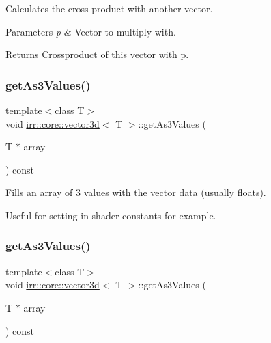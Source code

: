 Calculates the cross product with another vector. 


\begin{DoxyParams}{Parameters}
{\em p} & Vector to multiply with. \\
\hline
\end{DoxyParams}
\begin{DoxyReturn}{Returns}
Crossproduct of this vector with p. 
\end{DoxyReturn}
\mbox{\label{classirr_1_1core_1_1vector3d_af9e676bc10fe34e49e544373a33d7d21}} 
\subsubsection{\texorpdfstring{get\+As3\+Values()}{getAs3Values()}\hspace{0.1cm}{\footnotesize\ttfamily [1/2]}}
{\footnotesize\ttfamily template$<$class T$>$ \\
void \hyperlink{classirr_1_1core_1_1vector3d}{irr\+::core\+::vector3d}$<$ T $>$\+::get\+As3\+Values (\begin{DoxyParamCaption}\item[{T $\ast$}]{array }\end{DoxyParamCaption}) const\hspace{0.3cm}{\ttfamily [inline]}}



Fills an array of 3 values with the vector data (usually floats). 

Useful for setting in shader constants for example. \mbox{\label{classirr_1_1core_1_1vector3d_af9e676bc10fe34e49e544373a33d7d21}} 
\subsubsection{\texorpdfstring{get\+As3\+Values()}{getAs3Values()}\hspace{0.1cm}{\footnotesize\ttfamily [2/2]}}
{\footnotesize\ttfamily template$<$class T$>$ \\
void \hyperlink{classirr_1_1core_1_1vector3d}{irr\+::core\+::vector3d}$<$ T $>$\+::get\+As3\+Values (\begin{DoxyParamCaption}\item[{T $\ast$}]{array }\end{DoxyParamCaption}) const\hspace{0.3cm}{\ttfamily [inline]}}



